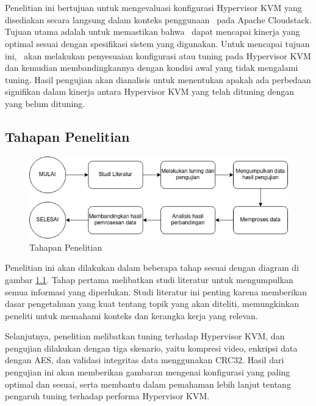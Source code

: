 \chapter{\babTiga}
Penelitian ini bertujuan untuk mengevaluasi konfigurasi Hypervisor KVM yang disediakan secara langsung dalam konteks penggunaan \vm\ pada Apache Cloudstack. Tujuan utama adalah untuk memastikan bahwa \vm\ dapat mencapai kinerja yang optimal sesuai dengan spesifikasi sistem yang digunakan. Untuk mencapai tujuan ini, \saya\ akan melakukan penyesuaian konfigurasi atau tuning pada Hypervisor KVM dan kemudian membandingkannya dengan kondisi awal yang tidak mengalami tuning. Hasil pengujian akan dianalisis untuk menentukan apakah ada perbedaan signifikan dalam kinerja antara Hypervisor KVM yang telah dituning dengan yang belum dituning.

\section{Tahapan Penelitian}
\begin{figure}
    \centering
    \includegraphics[width=1\textwidth]
    {assets/pics/tahapan-penelitian.png}
    \caption{Tahapan Penelitian}
    \label{fig:TahapanPenelitian}
\end{figure}

Penelitian ini akan dilakukan dalam beberapa tahap sesuai dengan diagram di gambar \ref{fig:TahapanPenelitian}. Tahap pertama melibatkan studi literatur untuk mengumpulkan semua informasi yang diperlukan. Studi literatur ini penting karena memberikan dasar pengetahuan yang kuat tentang topik yang akan diteliti, memungkinkan peneliti untuk memahami konteks dan kerangka kerja yang relevan.

Selanjutnya, penelitian melibatkan tuning terhadap Hypervisor KVM, dan pengujian dilakukan dengan tiga skenario, yaitu kompresi video, enkripsi data dengan AES, dan validasi integritas data menggunakan CRC32. Hasil dari pengujian ini akan memberikan gambaran mengenai konfigurasi yang paling optimal dan sesuai, serta membantu dalam pemahaman lebih lanjut tentang pengaruh tuning terhadap performa Hypervisor KVM.

